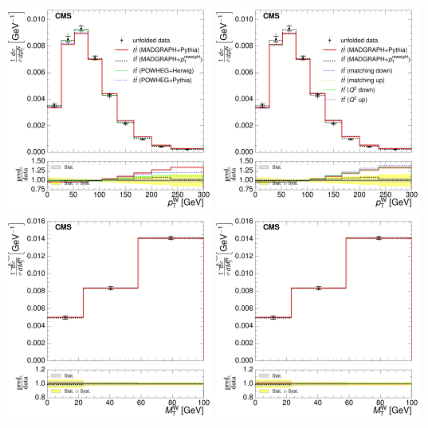 \begin{figure}[hbtp]
    \centering
     \includegraphics[width=0.48\textwidth]{Chapters/04_Analysis/04b_XSections/images/results/fit/7TeV/WPT/central/normalised_xsection_combined_different_generators.pdf}\hfill
     \includegraphics[width=0.48\textwidth]{Chapters/04_Analysis/04b_XSections/images/results/fit/7TeV/WPT/central/normalised_xsection_combined_systematics_shifts.pdf}\hfill
     \includegraphics[width=0.48\textwidth]{Chapters/04_Analysis/04b_XSections/images/results/fit/7TeV/MT/central/normalised_xsection_combined_different_generators.pdf}\hfill
     \includegraphics[width=0.48\textwidth]{Chapters/04_Analysis/04b_XSections/images/results/fit/7TeV/MT/central/normalised_xsection_combined_systematics_shifts.pdf}\hfill

\end{figure}
